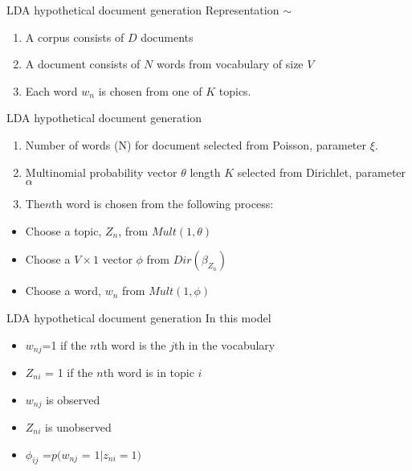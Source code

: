 \documentclass{beamer}
\begin{document}
\begin{frame}{LDA hypothetical document generation}
Representation $\sim$
\begin{enumerate}
\item  A corpus consists of $D$ documents\vspace{.5cm}
\item  A document consists of $N$ words from vocabulary of size $V$
\vspace{.5cm}
\item Each word $w_{n}$ is chosen from one of $K$ topics.
\end{enumerate}
\end{frame}

\begin{frame}{LDA hypothetical document generation}
\begin{enumerate}
\item Number of words (N) for document selected from Poisson, parameter {\mbox{\boldmath $\xi$}}. \\
\item Multinomial probability vector {\mbox{\boldmath $\theta$}}  length $K$ selected from Dirichlet, parameter {\mbox{\boldmath $\alpha$}}
\item The$n$th word is chosen from the following process:
\end{enumerate}
\begin{itemize}
\item Choose a topic, $Z_n$, from $Mult(1,\theta)$
\item Choose a $V \times 1$ vector $\phi$ from $Dir(\beta_{Z_n})$
\item Choose a word, $w_n$ from $Mult(1, \phi)$
\end{itemize}
\end{frame}

\begin{frame}{LDA hypothetical document generation}
In this model
\begin{itemize}
\item $w_{nj}$=1 if the $n$th word is the $j$th in the vocabulary
\item $Z_{ni}$ = 1 if the $n$th word is in topic $i$
\item $w_{nj}$ is observed
\item $Z_{ni}$ is unobserved
\item $\phi_{ij}$ =$ p(w_{nj}$ = $1|z_{ni}=1)$
\end{itemize}
\end{frame}
\end{document}
